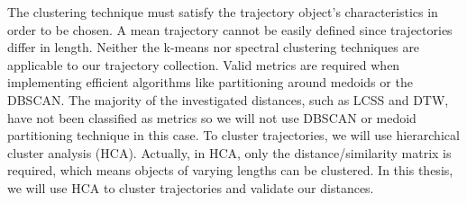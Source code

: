 \documentclass[a4paper, 12pt]{article}
\begin{document}







The clustering technique must satisfy the trajectory object's characteristics in order to be chosen. A mean trajectory cannot be easily defined since trajectories differ in length. Neither the k-means nor spectral clustering techniques are applicable to our trajectory collection. Valid metrics are required when implementing efficient algorithms like partitioning around medoids or the DBSCAN. The majority of the investigated distances, such as LCSS and DTW, have not been classified as metrics so we will not use DBSCAN or medoid partitioning technique in this case. To cluster trajectories, we will use hierarchical cluster analysis (HCA). Actually, in HCA, only the distance/similarity matrix is required, which means objects of varying lengths can be clustered. In this thesis, we will use HCA to cluster trajectories and validate our distances.
\end{document}
